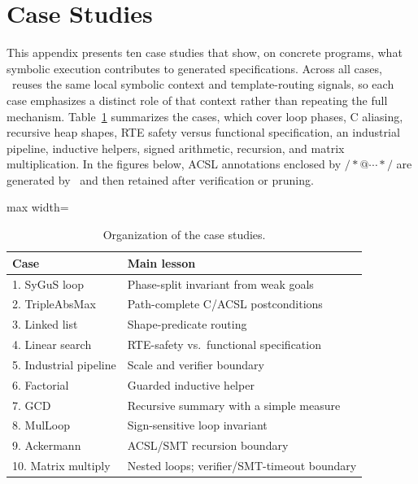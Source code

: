 \section{Case Studies}
\label{app:cases}
\suppressfloats[t]

This appendix presents ten case studies that show, on concrete programs, what symbolic execution contributes to generated specifications. Across all cases, \toolname\ reuses the same local symbolic context and template-routing signals, so each case emphasizes a distinct role of that context rather than repeating the full mechanism. Table~\ref{tab:case-study-map} summarizes the cases, which cover loop phases, C aliasing, recursive heap shapes, RTE safety versus functional specification, an industrial pipeline, inductive helpers, signed arithmetic, recursion, and matrix multiplication. In the figures below, ACSL annotations enclosed by $/*@\cdots */$ are generated by \toolname\ and then retained after verification or pruning.


\begin{table}[H]
  \centering
  \caption{Organization of the case studies.}
  \label{tab:case-study-map}
  \begin{adjustbox}{max width=\linewidth}
  \begin{tabular}{ll}
    \toprule
    \textbf{Case} & \textbf{Main lesson} \\
    \midrule
    1. SyGuS loop & Phase-split invariant from weak goals \\
    2. TripleAbsMax & Path-complete C/ACSL postconditions \\
    3. Linked list & Shape-predicate routing \\
    4. Linear search & RTE-safety vs.\ functional specification \\
    5. Industrial pipeline & Scale and verifier boundary \\
    6. Factorial & Guarded inductive helper \\
    7. GCD & Recursive summary with a simple measure \\
    8. MulLoop & Sign-sensitive loop invariant \\
    9. Ackermann & ACSL/SMT recursion boundary \\
    10. Matrix multiply & Nested loops; verifier/SMT-timeout boundary \\
    \bottomrule
  \end{tabular}%
  \end{adjustbox}
\end{table}

